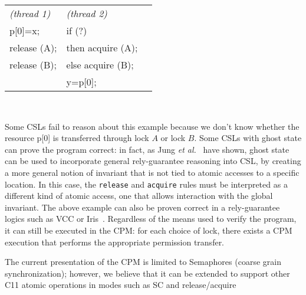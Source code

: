 \begin{tabular}{l@{\qquad\qquad}l@{\qquad\qquad\qquad}l}
\emph{(thread 1)} & \emph{(thread 2)} \\
    p[0]=x;      &  if (?) \\
    release (A); & then acquire (A); \\
    release (B); & else acquire (B); \\
                 & y=p[0]; \\
\end{tabular}

\

\noindent Some CSLs fail to reason about this example because we don't 
know whether the resource p[0] is
transferred through lock $A$ or lock $B$. Some CSLs with ghost state can
prove the program correct: in fact, as Jung \emph{et
  al.}~\cite{jung2015iris} have shown, ghost state can be used to
incorporate general rely-guarantee reasoning into CSL, by creating a
more general notion of invariant that is not tied to atomic accesses
to a specific location. In this case, the \texttt{release} and
\texttt{acquire} rules must be interpreted as a different kind of
atomic access, one that allows interaction with the global
invariant. The above example can also be proven correct in a rely-guarantee logics
such as VCC \cite{cohen09:tphols} or Iris~\cite{jung2015iris}. 
Regardless of the means used to verify the program, it can
still be executed in the CPM: for each choice of lock, there exists a CPM execution that performs the appropriate permission transfer.

The current presentation of the CPM is limited to Semaphores (coarse grain synchronization);
however, we believe that it can be extended to support other C11 atomic operations in modes such as SC and release/acquire %